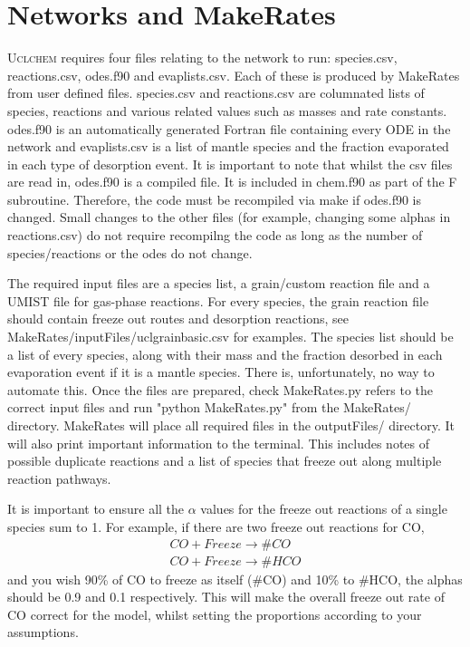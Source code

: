 \documentclass{llncs}
\begin{document}
\section{Networks and MakeRates}
\label{sec:network}
\textsc{Uclchem} requires four files relating to the network to run: species.csv, reactions.csv, odes.f90 and evaplists.csv. Each of these is produced by MakeRates from user defined files. species.csv and reactions.csv are columnated lists of species, reactions and various related values such as masses and rate constants. odes.f90 is an automatically generated Fortran file containing every ODE in the network and evaplists.csv is a list of mantle species and the fraction evaporated in each type of desorption event. It is important to note that whilst the csv files are read in, odes.f90 is a compiled file. It is included in chem.f90 as part of the F subroutine. Therefore, the code must be recompiled via make if odes.f90 is changed. Small changes to the other files (for example, changing some alphas in reactions.csv) do not require recompilng the code as long as the number of species/reactions or the odes do not change. \par
The required input files are a species list, a grain/custom reaction file and a UMIST file for gas-phase reactions. For every species, the grain reaction file should contain freeze out routes and desorption reactions, see MakeRates/inputFiles/uclgrainbasic.csv for examples. The species list should be a list of every species, along with their mass and the fraction desorbed in each evaporation event if it is a mantle species. There is, unfortunately, no way to automate this. Once the files are prepared, check MakeRates.py refers to the correct input files and run "python MakeRates.py" from the MakeRates/ directory. MakeRates will place all required files in the outputFiles/ directory. It will also print important information to the terminal. This includes notes of possible duplicate reactions and a list of species that freeze out along multiple reaction pathways. \par
It is important to ensure all the $\alpha$ values for the freeze out reactions of a single species sum to 1. For example, if there are two freeze out reactions for CO,
\begin{eqnarray}
CO + Freeze \rightarrow \#CO \\
CO + Freeze \rightarrow \#HCO
\end{eqnarray}
 and you wish 90\% of CO to freeze as itself (\#CO) and 10\% to \#HCO, the alphas should be 0.9 and 0.1 respectively. This will make the overall freeze out rate of CO correct for the model, whilst setting the proportions according to your assumptions.
%
%
\end{document}
